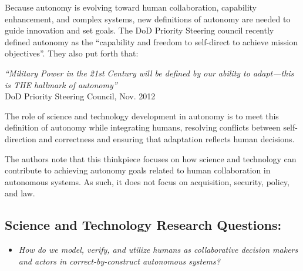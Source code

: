 
Because autonomy is evolving toward human collaboration, capability enhancement, and complex systems, 
new definitions of autonomy are needed to guide innovation and set goals.  The DoD Priority Steering
council recently defined autonomy as the ``capability and freedom to self-direct to achieve mission objectives''.
They also put forth that:
\begin{center}
\parbox[c]{6in}{
{\em ``Military Power in the 21st Century will be defined by our ability to adapt---this is THE hallmark of autonomy''
} \\
 \hspace*{20pt} DoD Priority Steering Council, Nov. 2012
}
\end{center}
The role of science and technology development in autonomy is to meet this definition of autonomy
while integrating humans, resolving conflicts between self-direction and correctness and 
ensuring that adaptation reflects human decisions.

The authors note that this thinkpiece focuses on how science and technology can contribute to achieving autonomy goals related to human collaboration in autonomous systems.
As such, it does not focus on acquisition, security, policy, and law.

\subsection*{Science and Technology Research Questions:}



\begin{itemize}
\item {\em How do we model, verify, and utilize humans as collaborative decision makers and actors in correct-by-construct autonomous systems?}
\end{itemize}


